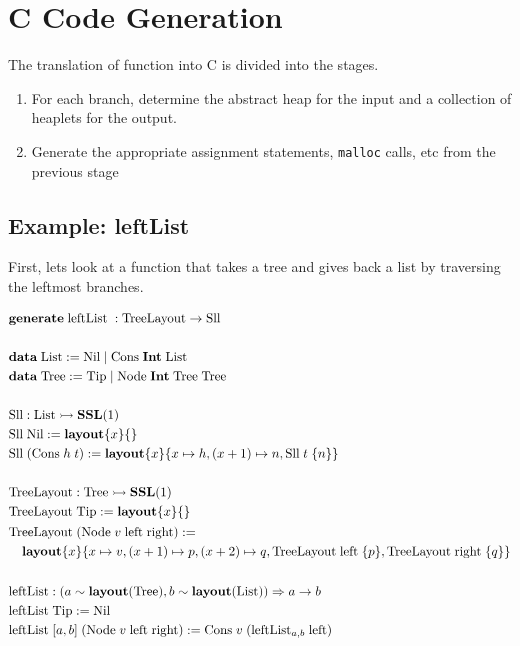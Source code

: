 \section{C Code Generation}

The translation of \PikaCore{} function into C is divided into the stages.

\begin{enumerate}
  \item \label{stage:in-out} For each branch, determine the abstract heap for the input and a collection of
    heaplets for the output.
  \item Generate the appropriate assignment statements, \verb|malloc| calls, etc from the
    previous stage
\end{enumerate}

\subsection{Example: leftList}
First, lets look at a \Pika{} function that takes a tree and gives back a list by traversing the leftmost branches.

$\begin{aligned}
  &\generate\; \textrm{leftList}\; : \textrm{TreeLayout} \ra \textrm{Sll}\\
  \\%
  &\data\; \textrm{List} := \textrm{Nil} \mid \textrm{Cons}\; \Int\; \textrm{List}\\
  &\data\; \textrm{Tree} := \textrm{Tip} \mid \textrm{Node}\; \Int\; \textrm{Tree}\; \textrm{Tree}\\
  \\%
  &\textrm{Sll} : \textrm{List} \monic \SSL(1)\\
  &\textrm{Sll}\; \textrm{Nil} := \sslmath{x}{}\\
  &\textrm{Sll}\; (\textrm{Cons}\; h\; t) := \sslmath{x}{ x \mapsto h, (x+1) \mapsto n, \textrm{Sll}\; t\; \{n\} }\\
  \\%
  &\textrm{TreeLayout} : \textrm{Tree} \monic \SSL(1)\\
  &\textrm{TreeLayout}\; \textrm{Tip} := \sslmath{x}{}\\
  &\begin{aligned}
    \textrm{Tr}&\textrm{eeLayout}\; (\textrm{Node}\; v\; \textrm{left}\; \textrm{right}) :=\\
        &\sslmath{x}{ x \mapsto v, (x+1) \mapsto p, (x+2) \mapsto q, \textrm{TreeLayout}\; \textrm{left}\; \{p\}, \textrm{TreeLayout}\; \textrm{right}\; \{q\}}
   \end{aligned}\\
  \\%
  &\textrm{leftList} : (a \isA \layout{\textrm{Tree}}, b \isA \layout{\textrm{List}}) \Ra a \ra b\\
  &\textrm{leftList}\; \textrm{Tip} := \textrm{Nil}\\
  &\textrm{leftList}\; [a, b]\; (\textrm{Node}\; v\; \textrm{left}\; \textrm{right}) :=
      \textrm{Cons}\; v\; (\textrm{leftList}_{a,b}\; \textrm{left})
\end{aligned}$
\\

